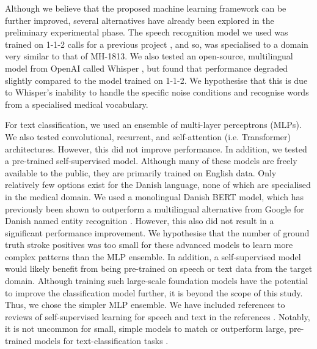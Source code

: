 {Although we believe that the proposed machine learning framework can be further improved, several alternatives have already been explored in the preliminary experimental phase. The speech recognition model we used was trained on 1-1-2 calls for a previous project \cite{cite14}, and so, was specialised to a domain very similar to that of MH-1813. We also tested an open-source, multilingual model from OpenAI called Whisper \cite{radford_robust_2023}, but found that performance degraded slightly compared to the model trained on 1-1-2. We hypothesise that this is due to Whisper's inability to handle the specific noise conditions and recognise words from a specialised medical vocabulary.

For text classification, we used an ensemble of multi-layer perceptrons (MLPs). We also tested convolutional, recurrent, and self-attention (i.e. Transformer) architectures. However, this did not improve performance. In addition, we tested a pre-trained self-supervised model. Although many of these models are freely available to the public, they are primarily trained on English data. Only relatively few options exist for the Danish language, none of which are specialised in the medical domain. We used a monolingual Danish BERT model, which has previously been shown to outperform a multilingual alternative from Google for Danish named entity recognition \cite{hvingelby_dane_2020}. However, this also did not result in a significant performance improvement. We hypothesise that the number of ground truth stroke positives was too small for these advanced models to learn more complex patterns than the MLP ensemble. In addition, a self-supervised model would likely benefit from being pre-trained on speech or text data from the target domain. Although training such large-scale foundation models have the potential to improve the classification model further, it is beyond the scope of this study. Thus, we chose the simpler MLP ensemble. We have included references to reviews of self-supervised learning for speech and text in the references \cite{gururangan_don_2020,mohamed_selfsupervised_2022}. Notably, it is not uncommon for small, simple models to match or outperform large, pre-trained models for text-classification tasks \cite{galke_bagofwords_2022}.

}
